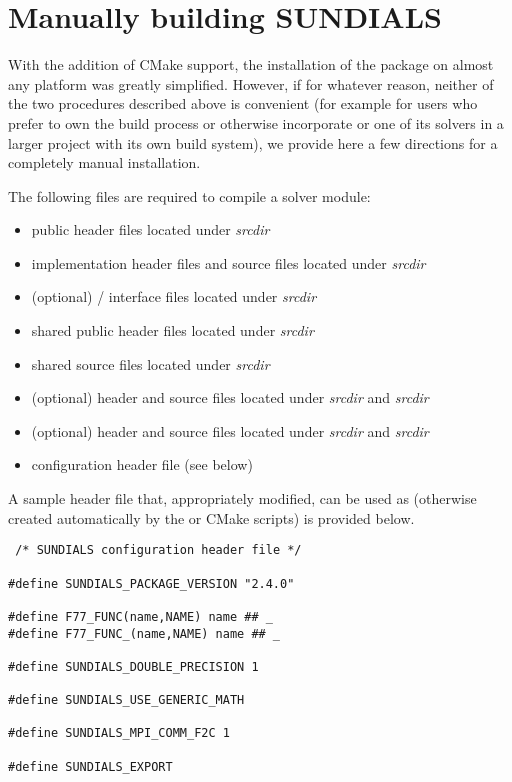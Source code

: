 \section{Manually building SUNDIALS}\label{ss:no_config}

With the addition of CMake support, the installation of the {\sundials} package 
on almost any platform was greatly simplified. However, if for whatever reason,
neither of the two procedures described above is convenient (for example for
users who prefer to own the build process or otherwise incorporate {\sundials}
or one of its solvers in a larger project with its own build system), we
provide here a few directions for a completely manual installation.

The following files are required to compile a {\sundials} solver module:
\begin{itemize}
\item public header files located under 
{\em srcdir}
\item implementation header files and source files located under
{\em srcdir}
\item (optional) {\F}/{\C} interface files located under
{\em srcdir}
\item shared public header files located under
{\em srcdir}
\item shared source files located under
{\em srcdir}
\item (optional) {\nvecs} header and source files located under
{\em srcdir} and {\em srcdir} 
\item (optional) {\nvecp} header and source files located under
{\em srcdir} and {\em srcdir} 
\item configuration header file  (see below)
\end{itemize}
A sample header file that, appropriately modified, can be used as
 (otherwise created automatically by the
 or CMake scripts) is provided below.


\begin{lstlisting}
 /* SUNDIALS configuration header file */

#define SUNDIALS_PACKAGE_VERSION "2.4.0"

#define F77_FUNC(name,NAME) name ## _
#define F77_FUNC_(name,NAME) name ## _

#define SUNDIALS_DOUBLE_PRECISION 1

#define SUNDIALS_USE_GENERIC_MATH

#define SUNDIALS_MPI_COMM_F2C 1

#define SUNDIALS_EXPORT
\end{lstlisting}


